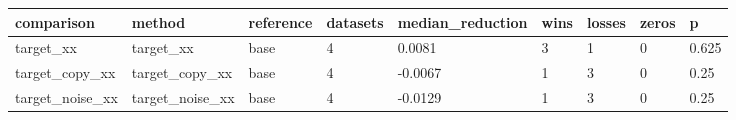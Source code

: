 \begin{tabular}{lllllllll}
\toprule
comparison & method & reference & datasets & median\_reduction & wins & losses & zeros & p \\
\midrule
target\_xx & target\_xx & base & 4 & 0.0081 & 3 & 1 & 0 & 0.625 \\
target\_copy\_xx & target\_copy\_xx & base & 4 & -0.0067 & 1 & 3 & 0 & 0.25 \\
target\_noise\_xx & target\_noise\_xx & base & 4 & -0.0129 & 1 & 3 & 0 & 0.25 \\
\bottomrule
\end{tabular}
